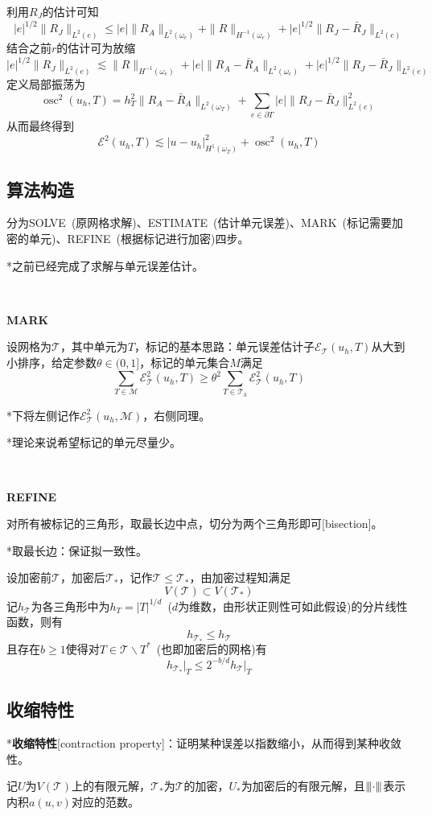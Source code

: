 \documentclass[a4paper,UTF8,fontset=windows]{ctexart}
\newcommand*{\ce}{\mathcal{E}}
\newcommand*{\ct}{\mathcal{T}}
\newcommand{\mm}[1]{{\left\vert\kern-0.25ex\left\vert\kern-0.25ex\left\vert #1 \right\vert\kern-0.25ex\right\vert\kern-0.25ex\right\vert}}
\DeclareMathOperator*{\osc}{osc}
\begin{document}
利用$R_J$的估计可知
$$|e|^{1/2}\|R_J\|_{L^2(e)}\le|e|\|R_A\|_{L^2(\omega_e)}+\|R\|_{H^{-1}(\omega_e)}+|e|^{1/2}\|R_J-\bar{R}_J\|_{L^2(e)}$$
结合之前$r$的估计可为放缩
$$|e|^{1/2}\|R_J\|_{L^2(e)}\lesssim\|R\|_{H^{-1}(\omega_e)}+|e|\|R_A-\bar{R}_A\|_{L^2(\omega_e)}+|e|^{1/2}\|R_J-\bar{R}_J\|_{L^2(e)}$$
定义局部振荡为
$$\osc^2(u_h,T)=h_T^2\|R_A-\bar{R}_A\|_{L^2(\omega_T)}+\sum_{e\in\partial T}|e|\|R_J-\bar{R}_J\|_{L^2(e)}^2$$
从而最终得到
$$\ce^2(u_h,T)\lesssim|u-u_h|_{H^1(\omega_T)}^2+\osc^2(u_h,T)$$

\subsection{算法构造}
分为SOLVE\ (原网格求解)、ESTIMATE\ (估计单元误差)、MARK\ (标记需要加密的单元)、REFINE\ (根据标记进行加密)四步。

*之前已经完成了求解与单元误差估计。

\

\textbf{MARK}

设网格为$\ct$，其中单元为$T$，标记的基本思路：单元误差估计子$\ce_\ct(u_h,T)$从大到小排序，给定参数$\theta\in(0,1]$，标记的单元集合$M$满足
$$\sum_{T\in\mathcal{M}}\ce_\ct^2(u_h,T)\ge\theta^2\sum_{T\in\ct_h}\ce_\ct^2(u_h,T)$$

*下将左侧记作$\ce_\ct^2(u_h,\mathcal{M})$，右侧同理。

*理论来说希望标记的单元尽量少。

\

\textbf{REFINE}

对所有被标记的三角形，取最长边中点，切分为两个三角形即可[bisection]。

*取最长边：保证拟一致性。

设加密前$\ct$，加密后$\ct_*$，记作$\ct\le\ct_*$，由加密过程知满足
$$V(\ct)\subset V(\ct_*)$$
记$h_\ct$为各三角形中为$h_T=|T|^{1/d}$\ ($d$为维数，由形状正则性可如此假设)的分片线性函数，则有
$$h_{\ct_*}\le h_\ct$$
且存在$b\ge1$使得对$T\in\ct\backslash T^*$\ (也即加密后的网格)有
$$h_{\ct_*}\big|_T\le2^{-b/d} h_\ct\big|_{T}$$

\subsection{收缩特性}

*\textbf{收缩特性}[contraction property]：证明某种误差以指数缩小，从而得到某种收敛性。

记$U$为$V(\ct)$上的有限元解，$\ct_*$为$\ct$的加密，$U_*$为加密后的有限元解，且$\mm{\cdot}$表示内积$a(u,v)$对应的范数。
\end{document}
